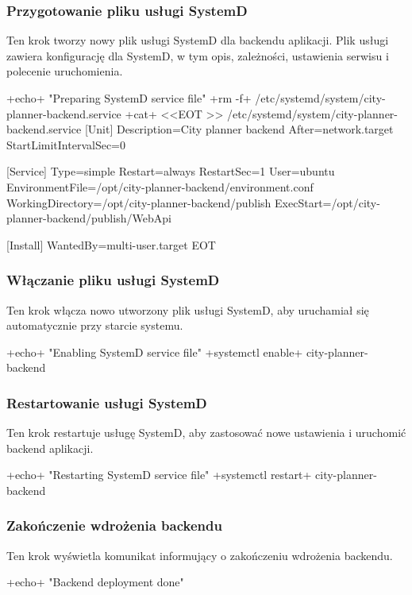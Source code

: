 \subsubsection{Przygotowanie pliku usługi SystemD}
Ten krok tworzy nowy plik usługi SystemD dla backendu aplikacji.
Plik usługi zawiera konfigurację dla SystemD, w tym opis, zależności, ustawienia serwisu i polecenie uruchomienia.

\begin{longlisting}[style=shell-colored,label={lst:db3}]
+echo+ "Preparing SystemD service file"
+rm -f+ /etc/systemd/system/city-planner-backend.service
+cat+ <<EOT >> /etc/systemd/system/city-planner-backend.service
[Unit]
Description=City planner backend
After=network.target
StartLimitIntervalSec=0

[Service]
Type=simple
Restart=always
RestartSec=1
User=ubuntu
EnvironmentFile=/opt/city-planner-backend/environment.conf
WorkingDirectory=/opt/city-planner-backend/publish
ExecStart=/opt/city-planner-backend/publish/WebApi

[Install]
WantedBy=multi-user.target
EOT
\end{longlisting}

\subsubsection{Włączanie pliku usługi SystemD}
Ten krok włącza nowo utworzony plik usługi SystemD, aby uruchamiał się automatycznie przy starcie systemu.
\begin{longlisting}[style=shell-colored,label={lst:db4}]
+echo+ "Enabling SystemD service file"
+systemctl enable+ city-planner-backend
\end{longlisting}

\subsubsection{Restartowanie usługi SystemD}
Ten krok restartuje usługę SystemD, aby zastosować nowe ustawienia i uruchomić backend aplikacji.
\begin{longlisting}[style=shell-colored,label={lst:db5}]
+echo+ "Restarting SystemD service file"
+systemctl restart+ city-planner-backend
\end{longlisting}

\subsubsection{Zakończenie wdrożenia backendu}
Ten krok wyświetla komunikat informujący o zakończeniu wdrożenia backendu.
\begin{longlisting}[style=shell-colored,label={lst:db6}]
+echo+ "Backend deployment done"
\end{longlisting}

